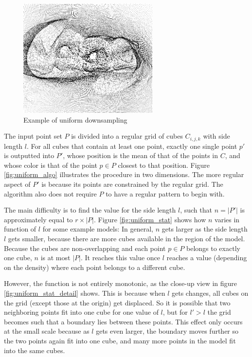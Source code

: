\documentclass[a4paper,10pt,abstracton,notitlepage]{scrreprt}
\begin{document}
\begin{figure}
\includegraphics[width=7cm,frame]{uniform_example_inv.png}
\caption{Example of uniform downsampling}
\label{fig:uniform_example}
\end{figure}
The input point set $P$ is divided into a regular grid of cubes $C_{i,j,k}$ with side length $l$. For all cubes that contain at least one point, exactly one single point $p'$ is outputted into $P'$, whose position is the mean of that of the points in $C$, and whose color is that of the point $p \in P$ closest to that position. Figure \ref{fig:uniform_algo} illustrates the procedure in two dimensions. The more regular aspect of $P'$ is because its points are constrained by the regular grid. The algorithm also does not require $P$ to have a regular pattern to begin with.

The main difficulty is to find the value for the side length $l$, such that $n = |P'|$ is approximately equal to $r \times |P|$. Figure \ref{fig:uniform_stat} shows how $n$ varies in function of $l$ for some example models: In general, $n$ gets larger as the side length $l$ gets smaller, because there are more cubes available in the region of the model. Because the cubes are non-overlapping and each point $p \in P$ belongs to exactly one cube, $n$ is at most $|P|$. It reaches this value once $l$ reaches a value (depending on the density) where each point belongs to a different cube.

However, the function is not entirely monotonic, as the close-up view in figure \ref{fig:uniform_stat_detail} shows. This is because when $l$ gets changes, all cubes on the grid (except those at the origin) get displaced. So it is possible that two neighboring points fit into one cube for one value of $l$, but for $l' > l$ the grid becomes such that a boundary lies between these points. This effect only occurs at the small scale because as $l$ gets even larger, the boundary moves further so the two points again fit into one cube, and many more points in the model fit into the same cubes.
\end{document}

